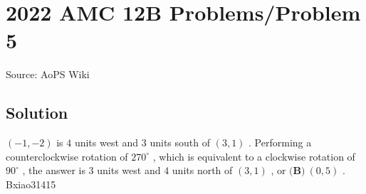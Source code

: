 \documentclass[12pt]{article}
\begin{document}
\section*{{2022 AMC 12B Problems/Problem 5}}
Source: AoPS Wiki

\subsection*{Solution}
$(-1,-2)$ is $4$ units west and $3$ units south of $(3,1)$ . Performing a counterclockwise rotation of $270^{\circ}$ , which is equivalent to a clockwise rotation of $90^{\circ}$ , the answer is $3$ units west and $4$ units north of $(3,1)$ , or $\boxed{\textbf{(B)}\ (0,5)}$ . ~ Bxiao31415
\end{document}

